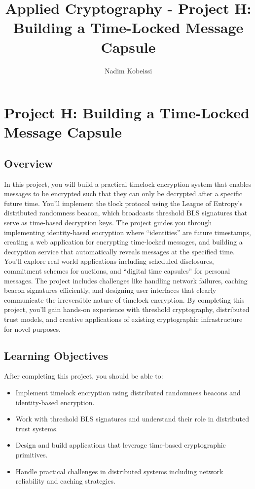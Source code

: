 \documentclass[10pt,a4paper,american]{exam}
\title{Applied Cryptography - Project H: Building a Time-Locked Message Capsule}
\author{Nadim Kobeissi}
\begin{document}
\classhandoutheader
\section*{Project H: Building a Time-Locked Message Capsule}

\subsection*{Overview}
In this project, you will build a practical timelock encryption system that enables messages to be encrypted such that they can only be decrypted after a specific future time. You'll implement the tlock protocol using the League of Entropy's distributed randomness beacon, which broadcasts threshold BLS signatures that serve as time-based decryption keys. The project guides you through implementing identity-based encryption where ``identities'' are future timestamps, creating a web application for encrypting time-locked messages, and building a decryption service that automatically reveals messages at the specified time. You'll explore real-world applications including scheduled disclosures, commitment schemes for auctions, and ``digital time capsules'' for personal messages. The project includes challenges like handling network failures, caching beacon signatures efficiently, and designing user interfaces that clearly communicate the irreversible nature of timelock encryption. By completing this project, you'll gain hands-on experience with threshold cryptography, distributed trust models, and creative applications of existing cryptographic infrastructure for novel purposes.

\subsection*{Learning Objectives}
After completing this project, you should be able to:
\begin{itemize}
	\item Implement timelock encryption using distributed randomness beacons and identity-based encryption.
	\item Work with threshold BLS signatures and understand their role in distributed trust systems.
	\item Design and build applications that leverage time-based cryptographic primitives.
	\item Handle practical challenges in distributed systems including network reliability and caching strategies.
\end{itemize}
\end{document}
